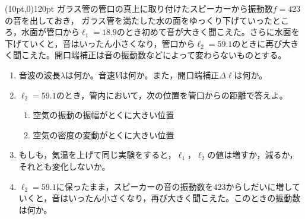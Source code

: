 \hakosyokika
\item
    \begin{mawarikomi}(10pt,0){120pt}{}
    ガラス管の管口の真上に取り付けたスピーカーから振動数$f=423$の音を出しておき，
    ガラス管を満たした水の面をゆっくり下げていったところ，水面が管口から$\ell _1=18.9$のとき初めて音が大きく聞こえた。さらに水面を下げていくと，音はいったん小さくなり，管口から$\ell _2=59.1$のときに再び大きく聞こえた。開口端補正は音の振動数などによって変わらないものとする。
        \begin{enumerate}
            \item 音波の波長$\lambda $は何か。音速$V$は何か。また，開口端補正$\varDelta \ell $は何か。
            \item $\ell _2=59.1$のとき，管内において，次の位置を管口からの距離で答えよ。
                \begin{enumerate}
                    \item 空気の振動の振幅がとくに大きい位置
                    \item 空気の密度の変動がとくに大きい位置
                \end{enumerate}
            \item もしも，気温を上げて同じ実験をすると，$\ell _1，\ell _2$の値は増すか，減るか，それとも変化しないか。
            \item $\ell _2=59.1$に保ったまま，スピーカーの音の振動数を$423$からしだいに増していくと，音はいったん小さくなり，再び大きく聞こえた。このときの振動数は何か。
        \end{enumerate}
    \end{mawarikomi}